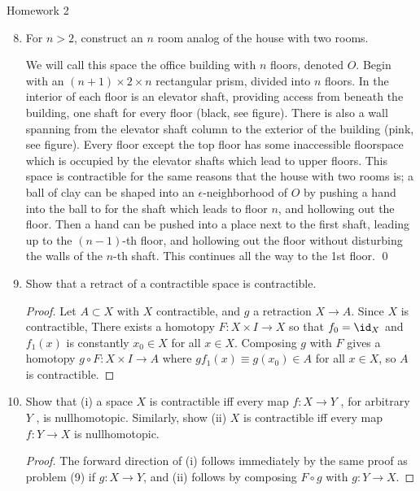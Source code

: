 \documentclass[12pt,letterpaper]{article}
\begin{document}
\pagestyle{fancy}
\begin{center}
{\Large Homework 2}%
\end{center}

\begin{enumerate}
\setcounter{enumi}{7}
\item For $n > 2$, construct an $n$ room analog of the house with two rooms.

\answer We will call this space the office building with $n$ floors, denoted $O$. Begin with an $(n+1)\times 2 \times n$ rectangular prism, divided into $n$ floors. In the interior of each floor is an elevator shaft, providing access from beneath the building, one shaft for every floor (black, see figure). There is also a wall spanning from the elevator shaft column to the exterior of the building (pink, see figure). 
Every floor except the top floor has some inaccessible floorspace which is occupied by the elevator shafts which lead to upper floors. 
This space is contractible for the same reasons that the house with two rooms is; a ball of clay can be shaped into an $\epsilon$-neighborhood of $O$ by pushing a hand into the ball to for the shaft which leads to floor $n$, and hollowing out the floor. Then a hand can be pushed into a place next to the first shaft, leading up to the $(n-1)$-th floor, and hollowing out the floor without disturbing the walls of the $n$-th shaft. This continues all the way to the 1st floor. \qed

\item Show that a retract of a contractible space is contractible.
\begin{proof}
Let $A\subset X$ with $X$ contractible, and $g$ a retraction $X\to A$. Since $X$ is contractible, There exists a homotopy $F:X\times I \to X$ so that $f_0=\id_X$ and $f_1(x)$ is constantly $x_0\in X$ for all $x\in X$. Composing $g$ with $F$ gives a homotopy $g\circ F:X\times I\to A$ where $gf_1(x)\equiv g(x_0)\in A$ for all $x\in X$, so $A$ is contractible. 
\end{proof}

\item Show that (i) a space $X$ is contractible iff every map $f: X\to Y$ , for arbitrary $Y$ , is nullhomotopic. Similarly, show (ii) $X$ is contractible iff every map $f : Y\to X$ is nullhomotopic.
\begin{proof}
The forward direction of (i) follows immediately by the same proof as problem (9) if $g:X\to Y$, and (ii) follows by composing $F\circ g$ with $g:Y\to X$. 


\end{proof}
\end{enumerate}
\end{document}

